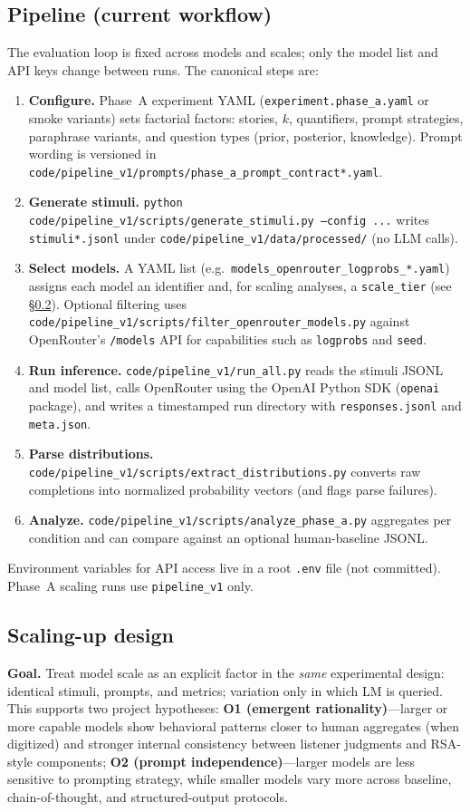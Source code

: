 \documentclass[11pt]{article}
\begin{document}
\subsection{Pipeline (current workflow)}
\label{sec:pipeline}
The evaluation loop is fixed across models and scales; only the model list and API keys change between runs. The canonical steps are:
\begin{enumerate}
  \item \textbf{Configure.} Phase~A experiment YAML (\texttt{experiment.phase\_a.yaml} or smoke variants) sets factorial factors: stories, $k$, quantifiers, prompt strategies, paraphrase variants, and question types (prior, posterior, knowledge). Prompt wording is versioned in \texttt{code/pipeline\_v1/prompts/phase\_a\_prompt\_contract*.yaml}.
  \item \textbf{Generate stimuli.} \texttt{python code/pipeline\_v1/scripts/generate\_stimuli.py --config ...} writes \texttt{stimuli*.jsonl} under \texttt{code/pipeline\_v1/data/processed/} (no LLM calls).
  \item \textbf{Select models.} A YAML list (e.g.\ \texttt{models\_openrouter\_logprobs\_*.yaml}) assigns each model an identifier and, for scaling analyses, a \texttt{scale\_tier} (see \S\ref{sec:scaling}). Optional filtering uses \texttt{code/pipeline\_v1/scripts/filter\_openrouter\_models.py} against OpenRouter's \texttt{/models} API for capabilities such as \texttt{logprobs} and \texttt{seed}.
  \item \textbf{Run inference.} \texttt{code/pipeline\_v1/run\_all.py} reads the stimuli JSONL and model list, calls OpenRouter using the OpenAI Python SDK (\texttt{openai} package), and writes a timestamped run directory with \texttt{responses.jsonl} and \texttt{meta.json}.
  \item \textbf{Parse distributions.} \texttt{code/pipeline\_v1/scripts/extract\_distributions.py} converts raw completions into normalized probability vectors (and flags parse failures).
  \item \textbf{Analyze.} \texttt{code/pipeline\_v1/scripts/analyze\_phase\_a.py} aggregates per condition and can compare against an optional human-baseline JSONL.
\end{enumerate}
Environment variables for API access live in a root \texttt{.env} file (not committed). Phase~A scaling runs use \texttt{pipeline\_v1} only.

\subsection{Scaling-up design}
\label{sec:scaling}
\textbf{Goal.} Treat model scale as an explicit factor in the \emph{same} experimental design: identical stimuli, prompts, and metrics; variation only in which LM is queried. This supports two project hypotheses: \textbf{O1 (emergent rationality)}---larger or more capable models show behavioral patterns closer to human aggregates (when digitized) and stronger internal consistency between listener judgments and RSA-style components; \textbf{O2 (prompt independence)}---larger models are less sensitive to prompting strategy, while smaller models vary more across baseline, chain-of-thought, and structured-output protocols.
\end{document}
